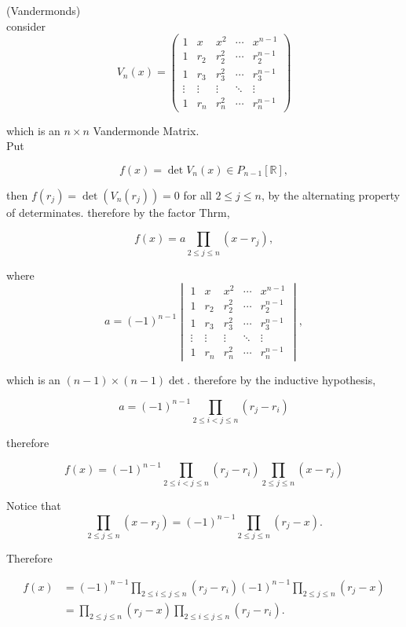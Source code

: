\begin{example}

  (Vandermonds) \\
  consider 
  \[ 
  V_n(x) = 
  \begin{pmatrix}
    1 & x & x^2  & \cdots & x^{n-1} \\
    1 & r_2 & r_2^2 & \cdots & r_2^{n-1} \\
    1 & r_3 & r_3^2 & \cdots & r_3^{n-1} \\
    \vdots & \vdots & \vdots & \ddots  & \vdots \\
    1 & r_n & r_n^2 & \cdots & r_n^{n-1}
  \end{pmatrix}
  \]

  which is an \( n \times n \) Vandermonde Matrix.\\
  Put 

  \[ f(x) = \det V_n(x) \in P_{n-1} \left[ \mathbb{R}\right],  \]

  then \( f(r_j) = \det (V_n(r_j)) = 0 \) for all \( 2 \leq j \leq n \),
  by the alternating property of determinates. therefore by the factor Thrm, 

  \[ f(x) = a \prod\limits_{2 \leq j \leq n} (x-r_j) ,  \] %

  where 
  \[ a = (-1)^{n-1}
  \begin{vmatrix}
    1 & x & x^2  & \cdots & x^{n-1} \\
    1 & r_2 & r_2^2 & \cdots & r_2^{n-1} \\
    1 & r_3 & r_3^2 & \cdots & r_3^{n-1} \\
    \vdots & \vdots & \vdots & \ddots  & \vdots \\
    1 & r_n & r_n^2 & \cdots & r_n^{n-1}
  \end{vmatrix}
  ,
  \]

  which is an \( (n-1) \times (n-1) \det \). therefore by the inductive
  hypothesis, 

  \[ a = (-1)^{n-1} \prod\limits_{2 \leq i < j \leq n}(r_j - r_i) \]

  therefore 

  \[ f(x) = (-1)^{n-1} \prod\limits_{2 \leq i < j \leq n} (r_j - r_i) \prod\limits_{2 \leq j \leq n} (x-r_j) \]

  Notice that 
  \[  \prod\limits_{2 \leq j \leq n}(x-r_j) = (-1)^{n-1}  \prod\limits_{2 \leq j \leq n}(r_j -x).  \]

  Therefore

  \begin{align*}
    f(x) &= (-1)^{n-1}  \prod\limits_{2 \leq i \leq j \leq n}(r_j-r_i)(-1)^{n-1}  \prod\limits_{2 \leq j \leq n}(r_j -x) \\
    &=  \prod\limits_{2 \leq j \leq n}(r_j -x)  \prod\limits_{2 \leq i
    \leq j \leq n} (r_j-r_i).  
  \end{align*}


\end{example}
